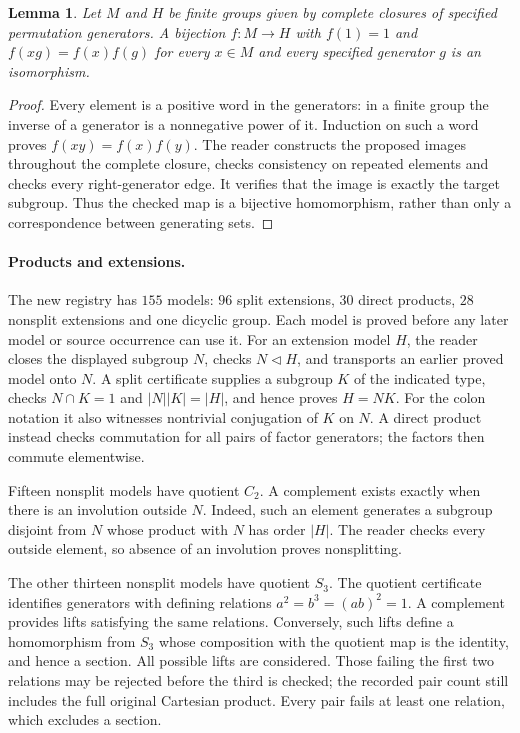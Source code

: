 \documentclass[11pt]{article}
\newtheorem{lemma}{Lemma}
\begin{document}
\begin{lemma}
Let $M$ and $H$ be finite groups given by complete closures of specified
permutation generators. A bijection $f:M\to H$ with $f(1)=1$ and
$f(xg)=f(x)f(g)$ for every $x\in M$ and every specified generator $g$
is an isomorphism.
\end{lemma}
\begin{proof}
Every element is a positive word in the generators: in a finite group
the inverse of a generator is a nonnegative power of it. Induction on
such a word proves $f(xy)=f(x)f(y)$. The reader constructs the proposed
images throughout the complete closure, checks consistency on repeated
elements and checks every right-generator edge. It verifies that the
image is exactly the target subgroup. Thus the checked map is a bijective
homomorphism, rather than only a correspondence between generating sets.
\end{proof}

\paragraph{Products and extensions.}
The new registry has $155$ models: $96$ split extensions, $30$ direct
products, $28$ nonsplit extensions and one dicyclic group. Each model is
proved before any later model or source occurrence can use it. For an
extension model $H$, the reader closes the displayed subgroup $N$,
checks $N\triangleleft H$, and transports an earlier proved model onto
$N$. A split certificate supplies a subgroup $K$ of the indicated type,
checks $N\cap K=1$ and $|N||K|=|H|$, and hence proves $H=NK$.
For the colon notation it also witnesses nontrivial conjugation of $K$
on $N$. A direct product instead checks commutation for all pairs of
factor generators; the factors then commute elementwise.

Fifteen nonsplit models have quotient $C_2$. A complement exists exactly
when there is an involution outside $N$. Indeed, such an element generates
a subgroup disjoint from $N$ whose product with $N$ has order $|H|$.
The reader checks every outside element, so absence of an involution
proves nonsplitting.

The other thirteen nonsplit models have quotient $S_3$. The quotient
certificate identifies generators with defining relations
$a^2=b^3=(ab)^2=1$. A complement provides lifts satisfying the same
relations. Conversely, such lifts define a homomorphism from $S_3$ whose
composition with the quotient map is the identity, and hence a section.
All possible lifts are considered. Those failing the first two relations
may be rejected before the third is checked; the recorded pair count
still includes the full original Cartesian product. Every pair fails
at least one relation, which excludes a section.
\end{document}
